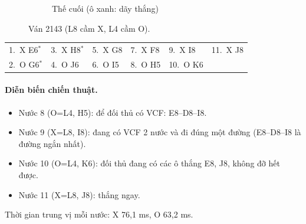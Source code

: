 \begin{figure}[H]
\begin{subfigure}[t]{.48\linewidth}
    \caption{Thế cuối (ô xanh: dãy thắng)}
  \end{subfigure}
  \caption{Ván 2143 (L8 cầm X, L4 cầm O).}
  \label{fig:cs-van-22}
\end{figure}
{\footnotesize\linespread{1}\selectfont
\noindent\begin{tabularx}{\linewidth}{*{6}{X}}
\toprule
1.~X E6$^\ast$ & 3.~X H8$^\ast$ & 5.~X G8 & 7.~X F8 & 9.~X I8 & 11.~X J8 \\
2.~O G6$^\ast$ & 4.~O J6 & 6.~O I5 & 8.~O H5 & 10.~O K6 &  \\
\bottomrule
\end{tabularx}\par}
\paragraph{Diễn biến chiến thuật.}
\begin{itemize}\footnotesize\linespread{1.1}\selectfont
\setlength{\itemsep}{0pt}
  \item Nước 8 (O=L4, H5): để đối thủ có VCF: E8--D8--I8.
  \item Nước 9 (X=L8, I8): đang có VCF 2 nước và đi đúng một đường (E8--D8--I8 là đường ngắn nhất).
  \item Nước 10 (O=L4, K6): đối thủ đang có các ô thắng E8, J8, không đỡ hết được.
  \item Nước 11 (X=L8, J8): thắng ngay.
\end{itemize}
Thời gian trung vị mỗi nước: X 76,1 ms, O 63,2 ms.
\clearpage

